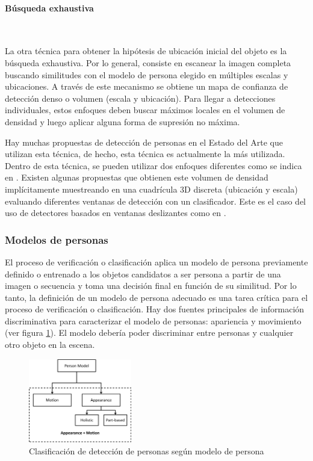 \paragraph*{Búsqueda exhaustiva}\mbox{} \\
\label{parag:deteccion-objetos-personas-busqueda-exhaustiva}

La otra técnica para obtener la hipótesis de ubicación inicial del objeto es la búsqueda exhaustiva. Por lo general, consiste en escanear la imagen completa buscando similitudes con el modelo de persona elegido en múltiples escalas y ubicaciones. A través de este mecanismo se obtiene un mapa de confianza de detección denso o volumen (escala y ubicación). Para llegar a detecciones individuales, estos enfoques deben buscar máximos locales en el volumen de densidad y luego aplicar alguna forma de supresión no máxima.

Hay muchas propuestas de detección de personas en el Estado del Arte que utilizan esta técnica, de hecho, esta técnica es actualmente la más utilizada. Dentro de esta técnica, se pueden utilizar dos enfoques diferentes como se indica en \cite{5674059}. Existen algunas propuestas que obtienen este volumen de densidad implícitamente muestreando en una cuadrícula 3D discreta (ubicación y escala) evaluando diferentes ventanas de detección con un clasificador. Este es el caso del uso de detectores basados en ventanas deslizantes como en \cite{4409057}.

\subsubsection*{Modelos de personas}
\label{subsubsec:modelos-personas-deteccion-personas-objetos}

El proceso de verificación o clasificación aplica un modelo de persona previamente definido o entrenado a los objetos candidatos a ser persona a partir de una imagen o secuencia y toma una decisión final en función de su similitud. Por lo tanto, la definición de un modelo de persona adecuado es una tarea crítica para el proceso de verificación o clasificación. Hay dos fuentes principales de información discriminativa para caracterizar el modelo de personas: apariencia y movimiento (ver figura \ref{fig:people-detection-people-model}). El modelo debería poder discriminar entre personas y cualquier otro objeto en la escena.

\begin{figure}[ht]
\centering
\includegraphics[width=0.4\textwidth]{img/chapters/estado-del-arte/people-detection-people-model.png}
\caption{\label{fig:people-detection-people-model}Clasificación de detección de personas según modelo de persona}
\end{figure}

